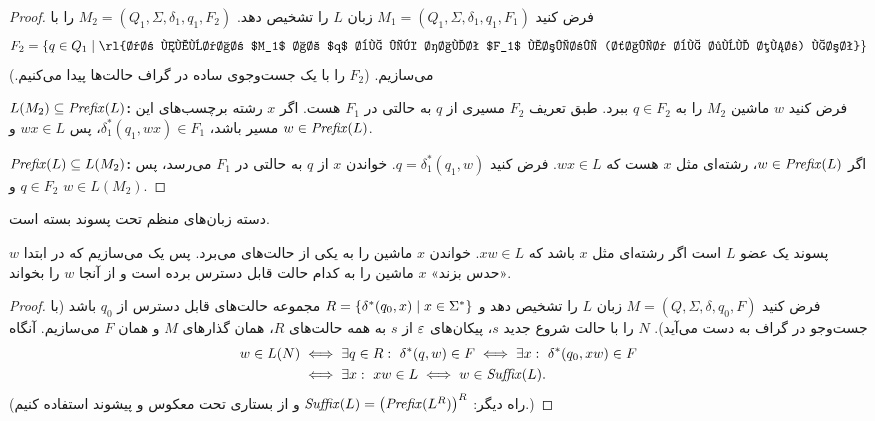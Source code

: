 \begin{proof}
فرض کنید  $M_1=(Q_1,\Sigma,\delta_1,q_1,F_1)$ زبان $L$ را تشخیص دهد. $M_2=(Q_1,\Sigma,\delta_1,q_1,F_2)$ را با
\[F_2=\{q\in Q_1\st \text{\rl{در نمودار $M_1$ از $q$ به یک حالت $F_1$ مسیری (شاید به طول صفر) هست}}\}\]
می‌سازیم. ($F_2$ را با یک جست‌وجوی ساده در گراف حالت‌ها پیدا می‌کنیم.)

\textbf{$L(M_2)\subseteq\mathit{Prefix}(L)$:} فرض کنید $w$ ماشین $M_2$ را به $q\in F_2$ ببرد. طبق تعریف $F_2$ مسیری از $q$ به حالتی در $F_1$ هست. اگر $x$ رشته برچسب‌های این مسیر باشد، $\delta_1^*(q_1,wx)\in F_1$، پس $wx\in L$ و $w\in\mathit{Prefix}(L)$.

\textbf{$\mathit{Prefix}(L)\subseteq L(M_2)$:} اگر $w\in\mathit{Prefix}(L)$، رشته‌ای مثل $x$ هست که $wx\in L$. فرض کنید $q=\delta_1^*(q_1,w)$. خواندن $x$ از $q$ به حالتی در $F_1$ می‌رسد، پس $q\in F_2$ و $w\in L(M_2)$.
\end{proof}

\begin{theorem}
دسته زبان‌های منظم تحت پسوند بسته است.
\end{theorem}

\begin{proofidea}
$w$ پسوند یک عضو $L$ است اگر رشته‌ای مثل $x$ باشد که $xw\in L$. خواندن $x$ ماشین را به یکی از حالت‌های  می‌برد. پس یک  می‌سازیم که در ابتدا «حدس بزند» $x$ ماشین را به کدام حالت قابل دسترس برده است و از آنجا $w$ را بخواند.
\end{proofidea}

\begin{proof}
فرض کنید  $M=(Q,\Sigma,\delta,q_0,F)$ زبان $L$ را تشخیص دهد و
$R=\{\delta^*(q_0,x)\mid x\in\Sigma^*\}$ مجموعه حالت‌های قابل دسترس از $q_0$ باشد (با جست‌وجو در گراف به دست می‌آید).  $N$ را با حالت شروع جدید $s$، پیکان‌های $\varepsilon$ از $s$ به همه حالت‌های $R$، همان گذارهای $M$ و همان $F$ می‌سازیم. آنگاه
\begin{align*}
w\in L(N)&\iff \exists q\in R:\ \delta^*(q,w)\in F\iff\exists x:\ \delta^*(q_0,xw)\in F\\
&\iff \exists x:\ xw\in L\iff w\in\suf(L).
\end{align*}
(راه دیگر: $\mathit{Suffix}(L)=\big(\mathit{Prefix}(L^R)\big)^R$ و از بستاری تحت معکوس و پیشوند استفاده کنیم.)
\end{proof}

